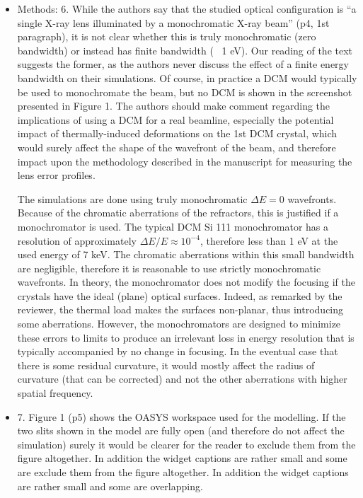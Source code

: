 \documentclass[11pt]{letter} %
\newcommand{\todo}[1]{{\color{red}[TODO: "#1'']}}
\newcommand{\inred}[1]{{\color{red}#1}}
\begin{document}
\begin{letter}{}
\begin{itemize}
    \inred{The reviewer is right that the error profiles were 2D. However, the analysis using Zernike polynomials is well adapted to 2D images with azimuthal symmetry. Indeed, most polynomials (or aberrations) found had only radial dependency and not azimuthal dependency. This experimental feature was used in our analysis to justify the use of 1D profiles. } \todo{Rafael: check...}
    

    \item Methods: 6. While the authors say that the studied optical configuration is “a single X-ray lens illuminated by a monochromatic X-ray beam” (p4, 1st paragraph), it is not clear whether this is truly monochromatic (zero bandwidth) or instead has finite bandwidth (~ 1 eV). Our reading of the text suggests the former, as the authors never discuss the effect of a finite energy bandwidth on their simulations. Of course, in practice a DCM would typically be used to monochromate the beam, but no DCM is shown in the screenshot presented in Figure 1. The authors should make comment regarding the implications of using a DCM for a real beamline, especially the potential impact of thermally-induced deformations on the 1st DCM crystal, which would surely affect the shape of the wavefront of the beam, and therefore impact upon the methodology described in the manuscript for measuring the lens error profiles.
    
    \inred{The simulations are done using truly monochromatic $\Delta E=0$ wavefronts. Because of the chromatic aberrations of the refractors, this is justified if a monochromator is used. The typical DCM Si 111 monochromator has a resolution of approximately $\Delta E/E \approx 10^{-4}$, therefore less than 1 eV at the used energy of 7 keV. The chromatic aberrations within this small bandwidth are negligible, therefore it is reasonable to use strictly monochromatic wavefronts. In theory, the monochromator does not modify the focusing if the crystals have the ideal (plane) optical surfaces. Indeed, as remarked by the reviewer, the thermal load makes the surfaces non-planar, thus introducing some aberrations. However, the monochromators are designed to minimize these errors to limits to produce an irrelevant loss in energy resolution that is typically accompanied by no change in focusing. In the eventual case that there is some residual curvature, it would mostly affect the radius of curvature (that can be corrected) and not the other aberrations with higher spatial frequency.}
    

    \item 7. Figure 1 (p5) shows the OASYS workspace used for the modelling. If the two slits shown in the model are fully open (and therefore do not affect the simulation) surely it would be clearer for the reader to exclude them from the figure altogether. In addition the widget captions are rather small and some are exclude them from the figure altogether. In addition the widget captions are rather small and some are overlapping.
    

\end{itemize}
\end{letter}
\end{document}

